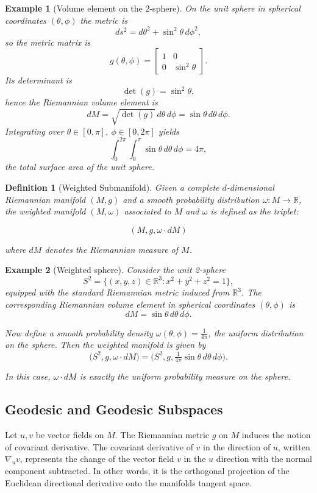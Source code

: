 \documentclass{article}
\newtheorem{definition}{Definition}
\newtheorem{example}{Example}
\begin{document}
\begin{example}[Volume element on the 2-sphere]
On the unit sphere in spherical coordinates $(\theta,\phi)$ the metric is
\[
ds^2 = d\theta^2 + \sin^2\theta\, d\phi^2,
\]
so the metric matrix is
\[
g(\theta,\phi) =
\begin{bmatrix}
1 & 0 \\
0 & \sin^2\theta
\end{bmatrix}.
\]
Its determinant is
\[
\det(g) = \sin^2\theta,
\]
hence the Riemannian volume element is
\[
dM = \sqrt{\det(g)}\, d\theta\, d\phi = \sin\theta\, d\theta\, d\phi.
\]
Integrating over $\theta\in[0,\pi],\ \phi\in[0,2\pi]$ yields
\[
\int_0^{2\pi}\int_0^\pi \sin\theta\, d\theta\, d\phi = 4\pi,
\]
the total surface area of the unit sphere.
\end{example}


\begin{definition}[Weighted Submanifold] 
Given a complete $d$-dimensional Riemannian manifold $(M, g)$ and a smooth probability distribution $\omega: M \rightarrow \mathbb{R}$, the weighted manifold $(M, \omega)$ associated to $M$ and $\omega$ is defined as the triplet:

\begin{equation}
   (M, g, \omega \cdot dM) 
\end{equation}

where $dM$ denotes the Riemannian measure of $M$.
\end{definition}


\begin{example}[Weighted sphere]
Consider the unit 2-sphere
\[
S^2 = \{ (x,y,z) \in \mathbb{R}^3 : x^2+y^2+z^2 = 1 \},
\]
equipped with the standard Riemannian metric induced from $\mathbb{R}^3$.  
The corresponding Riemannian volume element in spherical coordinates $(\theta,\phi)$ is
\[
dM = \sin\theta \, d\theta\, d\phi.
\]

Now define a smooth probability density $\omega(\theta,\phi) = \tfrac{1}{4\pi}$, the uniform distribution on the sphere.  
Then the weighted manifold is given by
\[
\bigl(S^2, g, \omega \cdot dM \bigr)
= \bigl(S^2, g, \tfrac{1}{4\pi} \sin\theta \, d\theta \, d\phi \bigr).
\]

In this case, $\omega \cdot dM$ is exactly the uniform probability measure on the sphere.
\end{example}

\subsection{Geodesic and Geodesic Subspaces}
Let $u, v$ be vector fields on $M$. The Riemannian metric $g$ on $M$ induces the notion of covariant derivative. 
The covariant derivative of $v$ in the direction of $u$, written $\nabla_u v$, represents the change of the vector field $v$
in the $u$ direction with the normal component subtracted. In other words, it is the orthogonal projection of the Euclidean directional 
derivative onto the manifolds tangent space.
\end{document}
